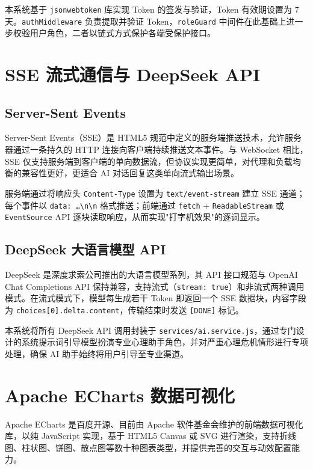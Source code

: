 本系统基于 \texttt{jsonwebtoken} 库实现 Token 的签发与验证，Token 有效期设置为 7 天。\texttt{authMiddleware} 负责提取并验证 Token，\texttt{roleGuard} 中间件在此基础上进一步校验用户角色，二者以链式方式保护各端受保护接口。

\section{SSE 流式通信与 DeepSeek API}

\subsection{Server-Sent Events}

Server-Sent Events（SSE）是 HTML5 规范中定义的服务端推送技术\cite{whatwg2023}，允许服务器通过一条持久的 HTTP 连接向客户端持续推送文本事件。与 WebSocket 相比，SSE 仅支持服务端到客户端的单向数据流，但协议实现更简单，对代理和负载均衡的兼容性更好，更适合 AI 对话回复这类单向流式输出场景。

服务端通过将响应头 \texttt{Content-Type} 设置为 \texttt{text/event-stream} 建立 SSE 通道；每个事件以 \texttt{data: \ldots\textbackslash n\textbackslash n} 格式推送；前端通过 \texttt{fetch} + \texttt{ReadableStream} 或 \texttt{EventSource} API 逐块读取响应，从而实现"打字机效果"的逐词显示。

\subsection{DeepSeek 大语言模型 API}

DeepSeek 是深度求索公司推出的大语言模型系列\cite{deepseek2024}，其 API 接口规范与 OpenAI Chat Completions API 保持兼容，支持流式（\texttt{stream: true}）和非流式两种调用模式。在流式模式下，模型每生成若干 Token 即返回一个 SSE 数据块，内容字段为 \texttt{choices[0].delta.content}，传输结束时发送 \texttt{[DONE]} 标记。

本系统将所有 DeepSeek API 调用封装于 \texttt{services/ai.service.js}，通过专门设计的系统提示词引导模型扮演专业心理助手角色，并对严重心理危机情形进行专项处理，确保 AI 助手始终将用户引导至专业渠道。


\section{Apache ECharts 数据可视化}

Apache ECharts 是百度开源、目前由 Apache 软件基金会维护的前端数据可视化库\cite{echarts2018}，以纯 JavaScript 实现，基于 HTML5 Canvas 或 SVG 进行渲染，支持折线图、柱状图、饼图、散点图等数十种图表类型，并提供完善的交互与动效配置能力。

